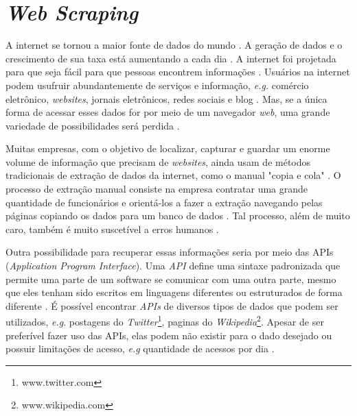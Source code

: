


\section{\textit{Web Scraping}}

A internet se tornou a maior fonte de dados do mundo \cite{banerjee2014website}. A geração de dados e o crescimento de sua taxa está aumentando a cada dia \cite{dastidar2016intelligent}. A internet foi projetada para que seja fácil para que pessoas encontrem informações \cite{banerjee2014website}. Usuários na internet podem usufruir abundantemente de serviços e informação, \textit{e.g.} comércio eletrônico, \textit{websites}, jornais eletrônicos, redes sociais e blog \cite{dastidar2016intelligent}. Mas, se a única forma de acessar esses dados for por meio de um navegador \textit{web}, uma grande variedade de possibilidades será perdida \cite{mitchell2018web}. 

Muitas empresas, com o objetivo de localizar, capturar e guardar um enorme volume de informação que precisam de \textit{websites}, ainda usam de métodos tradicionais de extração de dados da internet, como o manual "copia e cola" \cite{banerjee2014website}. O processo de extração manual consiste na empresa contratar uma grande quantidade de funcionários e orientá-los a fazer a extração navegando pelas páginas copiando os dados para um banco de dados \cite{banerjee2014website}. Tal processo, além de muito caro, também é muito suscetível a erros humanos \cite{banerjee2014website}. 

Outra possibilidade para recuperar essas informações seria por meio das APIs (\textit{Application Program Interface}). Uma \textit{API} define uma sintaxe padronizada que permite uma parte de um software se comunicar com uma outra parte, mesmo que eles tenham sido escritos em linguagens diferentes ou estruturados de forma diferente \cite{mitchell2018web}. É possível encontrar \textit{APIs} de diversos tipos de dados que podem ser utilizados, \textit{e.g}. postagens do \textit{Twitter}\footnote{www.twitter.com}, paginas do \textit{Wikipedia}\footnote{www.wikipedia.com}. Apesar de ser preferível fazer uso das APIs, elas podem não existir para o dado desejado ou possuir limitações de acesso, \textit{e.g} quantidade de acessos por dia \cite{mitchell2018web}.

